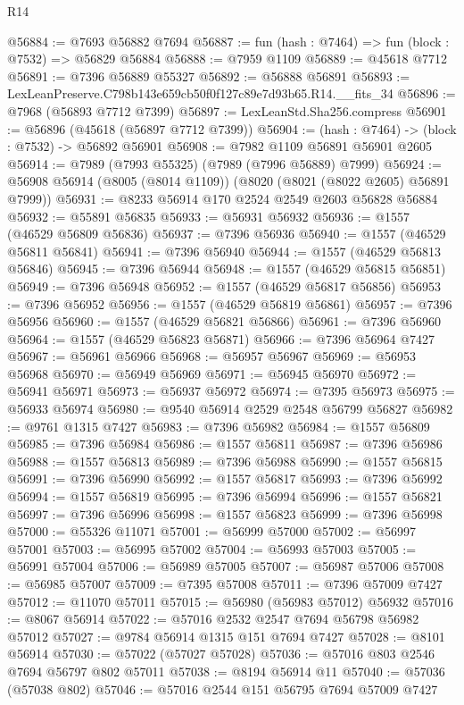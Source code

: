 \begin{lexlean}{R14}
\begin{coremodule}
@56884 := @7693 @56882 @7694
@56887 := fun (hash : @7464) => fun (block : @7532) => @56829 @56884
@56888 := @7959 @1109
@56889 := @45618 @7712
@56891 := @7396 @56889 @55327
@56892 := @56888 @56891
@56893 := LexLeanPreserve.C798b143e659cb50f0f127c89e7d93b65.R14.__fits_34
@56896 := @7968 (@56893 @7712 @7399)
@56897 := LexLeanStd.Sha256.compress
@56901 := @56896 (@45618 (@56897 @7712 @7399))
@56904 := (hash : @7464) -> (block : @7532) -> @56892 @56901
@56908 := @7982 @1109 @56891 @56901 @2605
@56914 := @7989 (@7993 @55325) (@7989 (@7996 @56889) @7999)
@56924 := @56908 @56914 (@8005 (@8014 @1109)) (@8020 (@8021 (@8022 @2605) @56891 @7999))
@56931 := @8233 @56914 @170 @2524 @2549 @2603 @56828 @56884
@56932 := @55891 @56835
@56933 := @56931 @56932
@56936 := @1557 (@46529 @56809 @56836)
@56937 := @7396 @56936
@56940 := @1557 (@46529 @56811 @56841)
@56941 := @7396 @56940
@56944 := @1557 (@46529 @56813 @56846)
@56945 := @7396 @56944
@56948 := @1557 (@46529 @56815 @56851)
@56949 := @7396 @56948
@56952 := @1557 (@46529 @56817 @56856)
@56953 := @7396 @56952
@56956 := @1557 (@46529 @56819 @56861)
@56957 := @7396 @56956
@56960 := @1557 (@46529 @56821 @56866)
@56961 := @7396 @56960
@56964 := @1557 (@46529 @56823 @56871)
@56966 := @7396 @56964 @7427
@56967 := @56961 @56966
@56968 := @56957 @56967
@56969 := @56953 @56968
@56970 := @56949 @56969
@56971 := @56945 @56970
@56972 := @56941 @56971
@56973 := @56937 @56972
@56974 := @7395 @56973
@56975 := @56933 @56974
@56980 := @9540 @56914 @2529 @2548 @56799 @56827
@56982 := @9761 @1315 @7427
@56983 := @7396 @56982
@56984 := @1557 @56809
@56985 := @7396 @56984
@56986 := @1557 @56811
@56987 := @7396 @56986
@56988 := @1557 @56813
@56989 := @7396 @56988
@56990 := @1557 @56815
@56991 := @7396 @56990
@56992 := @1557 @56817
@56993 := @7396 @56992
@56994 := @1557 @56819
@56995 := @7396 @56994
@56996 := @1557 @56821
@56997 := @7396 @56996
@56998 := @1557 @56823
@56999 := @7396 @56998
@57000 := @55326 @11071
@57001 := @56999 @57000
@57002 := @56997 @57001
@57003 := @56995 @57002
@57004 := @56993 @57003
@57005 := @56991 @57004
@57006 := @56989 @57005
@57007 := @56987 @57006
@57008 := @56985 @57007
@57009 := @7395 @57008
@57011 := @7396 @57009 @7427
@57012 := @11070 @57011
@57015 := @56980 (@56983 @57012) @56932
@57016 := @8067 @56914
@57022 := @57016 @2532 @2547 @7694 @56798 @56982 @57012
@57027 := @9784 @56914 @1315 @151 @7694 @7427
@57028 := @8101 @56914
@57030 := @57022 (@57027 @57028)
@57036 := @57016 @803 @2546 @7694 @56797 @802 @57011
@57038 := @8194 @56914 @11
@57040 := @57036 (@57038 @802)
@57046 := @57016 @2544 @151 @56795 @7694 @57009 @7427

\end{coremodule}
\end{lexlean}
